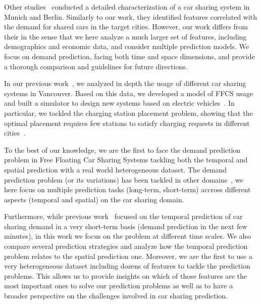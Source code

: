 Other studies~\citep{schmoller2014analyzing,schmoller2015empirical} conducted a detailed characterization of a car sharing system in Munich and Berlin. Similarly to our work, they identified features correlated with the demand for shared cars in the target cities. However, our work differs from their in the sense that we here analyze a much larger set of features, including demographics and economic data, and consider multiple prediction models. We focus on demand prediction, facing both time and space dimensions, and provide a thorough comparison and guidelines for future directions.

In our previous work~\citep{VancouverCS}, we analyzed in depth the usage of different car sharing systems in Vancouver. Based on this data, we developed a model of FFCS usage and built a simulator to design new systems based on electric vehicles~\citep{coccacar}. In particular, we tackled the charging station placement problem, showing that the optimal placement requires few stations to satisfy charging requests in different cities~\citep{coccaopt}.  

To the best of our knowledge, we are the first to face the demand prediction problem in Free Floating Car Sharing Systems tackling both the temporal and spatial prediction with a real world heterogeneous dataset. The demand prediction problem (or its variations) has been tackled in other domains~\citep{He:2019,Hulot:2018}, we here focus on multiple prediction tasks (long-term, short-term) accross different aspects (temporal and spatial) on the car sharing domain.


Furthermore, while previous work~\citep{wang2017deepsd} focused on the temporal prediction of car sharing demand in a very short-term basis (demand prediction in the next few minutes), in this work we focus on the problem at different time scales. We also compare several prediction strategies and analyze how the temporal prediction problem relates to the spatial prediction one.
Moreover, we are the first to use a very heterogeneous dataset including dozens of features to tackle the prediction problems. This allows us to provide insights on which of those features are the most important ones to solve our prediction problems as well as to have a broader perspective on the challenges involved in car sharing prediction.

